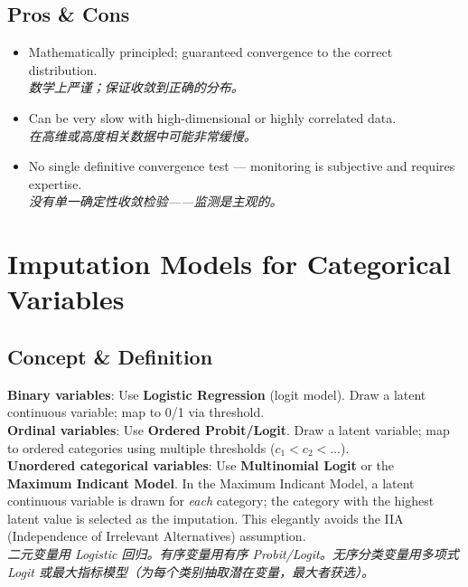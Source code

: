\documentclass[9pt, a4paper]{article}
\begin{document}
\subsection{Pros \& Cons}
\begin{tcolorbox}[prosbox]
    \begin{itemize}
        \item [\ding{51}] Mathematically principled; guaranteed convergence to the correct distribution.\\
        \textit{数学上严谨；保证收敛到正确的分布。}
    \end{itemize}
\end{tcolorbox}
\begin{tcolorbox}[consbox]
    \begin{itemize}
        \item [\ding{55}] Can be very slow with high-dimensional or highly correlated data.\\
        \textit{在高维或高度相关数据中可能非常缓慢。}
        \item [\ding{55}] No single definitive convergence test --- monitoring is subjective and requires expertise.\\
        \textit{没有单一确定性收敛检验——监测是主观的。}
    \end{itemize}
\end{tcolorbox}

\section{Imputation Models for Categorical Variables}

\subsection{Concept \& Definition}
\begin{tcolorbox}[defbox]
    \textbf{Binary variables}: Use \textbf{Logistic Regression} (logit model). Draw a latent continuous variable; map to 0/1 via threshold.\\[3pt]
    \textbf{Ordinal variables}: Use \textbf{Ordered Probit/Logit}. Draw a latent variable; map to ordered categories using multiple thresholds ($c_1 < c_2 < \ldots$).\\[3pt]
    \textbf{Unordered categorical variables}: Use \textbf{Multinomial Logit} or the \textbf{Maximum Indicant Model}. In the Maximum Indicant Model, a latent continuous variable is drawn for \textit{each} category; the category with the highest latent value is selected as the imputation. This elegantly avoids the IIA (Independence of Irrelevant Alternatives) assumption.\\[3pt]
    \textit{二元变量用 Logistic 回归。有序变量用有序 Probit/Logit。无序分类变量用多项式 Logit 或最大指标模型（为每个类别抽取潜在变量，最大者获选）。}
\end{tcolorbox}
\end{document}
